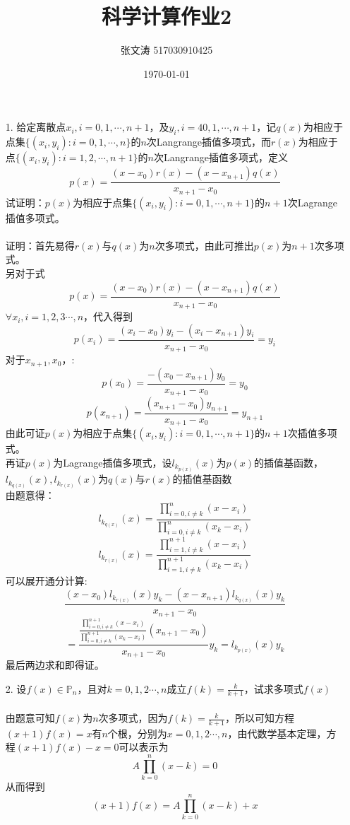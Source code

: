 \documentclass{article}
\title{科学计算作业2}
\author{张文涛 517030910425}
\date{\today}
\begin{document}
	\maketitle
	\begin{itemize}
		\item[1.]给定离散点$x_{i}, i = 0,1,\cdots,n+1$，及$y_{i}, i = 40,1,\cdots,n+1$，记$q(x)$为相应于点集$\{(x_{i},y_{i}):i=0,1,\cdots,n\}$的$n$次Langrange插值多项式，而$r(x)$为相应于点$\{(x_{i},y_{i}):i=1,2,\cdots,n+1\}$的$n$次Langrange插值多项式，定义\[p(x) = \frac{(x-x_{0})r(x) - (x-x_{n+1})q(x)}{x_{n+1}-x_{0}}\]
		试证明：$p(x)$为相应于点集$\{(x_{i},y_{i}):i=0,1,\cdots,n+1\}$的$n+1$次Lagrange插值多项式。\\\\
		证明：首先易得$r(x)$与$q(x)$为$n$次多项式，由此可推出$p(x)$为$n+1$次多项式。\\
		另对于式\[p(x) = \frac{(x-x_{0})r(x) - (x-x_{n+1})q(x)}{x_{n+1}-x_{0}}\]
		$\forall x_{i}, i = 1, 2, 3\cdots,n$，代入得到\[p(x_{i})=\frac{(x_{i} - x_{0})y_{i} - (x_{i} - x_{n+1})y_{i}}{x_{n+1} - x_{0}} = y_{i}\]
		对于$x_{n+1},x_{0}$，:
		\[p(x_{0})=\frac{-(x_{0}-x_{n+1})y_{0}}{x_{n+1}-x_{0}} = y_{0}\]
		\[p(x_{n+1})=\frac{(x_{n+1}-x_{0})y_{n+1}}{x_{n+1}-x_{0}} = y_{n+1}\]
		由此可证$p(x)$为相应于点集$\{(x_{i},y_{i}):i=0,1,\cdots,n+1\}$的$n+1$次插值多项式。\\
		再证$p(x)$为Lagrange插值多项式，设$l_{k_{p(x)}}(x)$为$p(x)$的插值基函数，$l_{k_{q(x)}}(x),l_{k_{r(x)}}(x)$为$q(x)$与$r(x)$的插值基函数\\
		由题意得：
		\[l_{k_{q(x)}}(x) =\frac{\prod_{i = 0, i \ne k}^{n}(x-x_{i})}{\prod_{i = 0, i \ne k}^{n}(x_{k}-x_{i})}\]
		\[l_{k_{r(x)}}(x) =\frac{\prod_{i = 1, i \ne k}^{n+1}(x-x_{i})}{\prod_{i = 1, i \ne k}^{n+1}(x_{k}-x_{i})}\]
		可以展开通分计算:
		\[\frac{(x-x_{0})l_{k_{r(x)}}(x)y_{k} - (x-x_{n+1})l_{k_{q(x)}}(x)y_{k}}{x_{n+1}-x_{0}}\]
		\[=\frac{\frac{\prod_{i=0, i\ne k}^{n+1}(x-x_{i})}{\prod_{i=0, i\ne k}^{n+1}(x_{k}-x_{i})}(x_{n+1} - x_{0})}{x_{n+1}-x_{0}}y_{k} = l_{k_{p(x)}}(x)y_{k}\]
		最后两边求和即得证。
		\\
		\item[2.]设$f(x)\in \mathbb{P}_{n}$，且对$k =  0,1,2\cdots,n$成立$f(k)=\frac{k}{k+1}$，试求多项式$f(x)$\\\\
		由题意可知$f(x)$为$n$次多项式，因为$f(k)=\frac{k}{k+1}$，所以可知方程$(x+1)f(x) = x$有$n$个根，分别为$x =  0,1,2\cdots,n$，由代数学基本定理，方程$(x+1)f(x)-x=0$可以表示为\[A\prod_{k=0}^{n}(x-k) = 0\]
		从而得到
		\[(x+1)f(x) = A\prod_{k=0}^{n}(x-k)+ x\]

\end{itemize}
\end{document}
